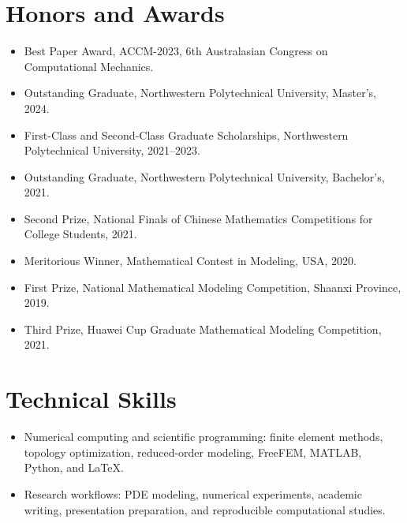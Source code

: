 \documentclass[8pt,a4paper]{extarticle}
\newcommand{\compactlist}{%
  \begin{itemize}[leftmargin=1em,itemsep=0.04em,topsep=0.05em]
}
\newcommand{\finishcompactlist}{\end{itemize}}
\begin{document}
\section{Honors and Awards}
\compactlist
  \item Best Paper Award, ACCM-2023, 6th Australasian Congress on Computational Mechanics.
  \item Outstanding Graduate, Northwestern Polytechnical University, Master's, 2024.
  \item First-Class and Second-Class Graduate Scholarships, Northwestern Polytechnical University, 2021--2023.
  \item Outstanding Graduate, Northwestern Polytechnical University, Bachelor's, 2021.
  \item Second Prize, National Finals of Chinese Mathematics Competitions for College Students, 2021.
  \item Meritorious Winner, Mathematical Contest in Modeling, USA, 2020.
  \item First Prize, National Mathematical Modeling Competition, Shaanxi Province, 2019.
  \item Third Prize, Huawei Cup Graduate Mathematical Modeling Competition, 2021.
\finishcompactlist

\section{Technical Skills}
\compactlist
  \item Numerical computing and scientific programming: finite element methods, topology optimization, reduced-order modeling, FreeFEM, MATLAB, Python, and LaTeX.
  \item Research workflows: PDE modeling, numerical experiments, academic writing, presentation preparation, and reproducible computational studies.
\finishcompactlist
\end{document}
